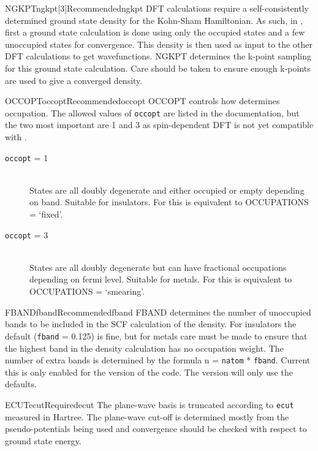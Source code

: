 \documentclass[11pt]{report}
\begin{document}
\begin{Card}{NGKPT}{ngkpt[3]}{Recommended}{ngkpt}
DFT calculations require a self-consistently determined ground state density for the Kohn-Sham Hamiltonian. As such, in \OCEAN{}, first a ground state calculation is done using only the occupied states and a few unoccupied states for convergence. This density is then used as input to the other DFT calculations to get wavefunctions. NGKPT determines the k-point sampling for this ground state calculation. Care should be taken to ensure enough k-points are used to give a converged density.
\end{Card}

\begin{Card}{OCCOPT}{occopt}{Recommended}{occopt}
OCCOPT controls how  determines occupation. The allowed values of \texttt{occopt} are listed in the  documentation, but the two most important are 1 and 3 as spin-dependent DFT is not yet compatible with \OCEAN{}.
\begin{description}
\item[\texttt{occopt} = 1]\hfill\\ States are all doubly degenerate and either occupied or empty depending on band. Suitable for insulators. 
	For  this is equivalent to  OCCUPATIONS = `fixed'.
\item[\texttt{occopt} = 3]\hfill\\ States are all doubly degenerate but can have fractional occupations depending on fermi level. Suitable for metals. For  this is equivalent to OCCUPATIONS = `smearing'. 
\end{description}
\end{Card}

\begin{Card}{FBAND}{fband}{Recommended}{fband}
FBAND determines the number of unoccupied bands to be included in the SCF calculation of the density. For insulators the default (\texttt{fband} = 0.125) is fine, but for metals care must be made to ensure that the highest band in the density calculation has no occupation weight. The number of extra bands is determined by the formula n = \texttt{natom} * \texttt{fband}. Current this is only enabled for the  version of the code. The  version will only use the defaults. 
\end{Card}

\begin{Card}{ECUT}{ecut}{Required}{ecut}
The plane-wave basis is truncated according to \texttt{ecut} measured in Hartree. The plane-wave cut-off is determined mostly from the pseudo-potentials being used and convergence should be checked with respect to ground state energy.
\end{Card}
\end{document}
